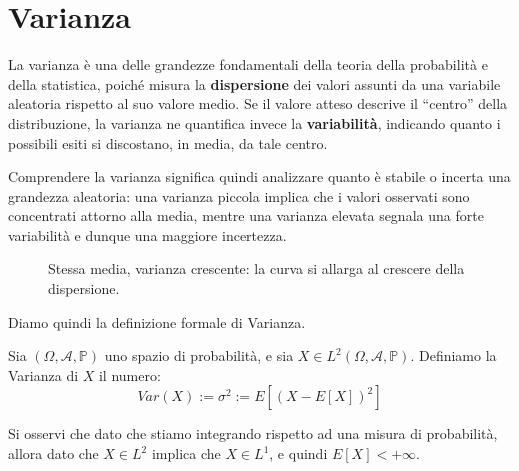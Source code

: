\section{Varianza}
La varianza è una delle grandezze fondamentali della teoria della probabilità e della statistica, poiché misura la \textbf{dispersione} dei valori assunti da una variabile aleatoria rispetto al suo valore medio. Se il valore atteso descrive il ``centro'' della distribuzione, la varianza ne quantifica invece la \textbf{variabilità}, 
indicando quanto i possibili esiti si discostano, in media, da tale centro.

\medskip

Comprendere la varianza significa quindi analizzare quanto è stabile o incerta una grandezza aleatoria: una varianza piccola implica che i valori osservati sono concentrati attorno alla media, mentre una varianza elevata segnala una forte variabilità e dunque una maggiore incertezza.

\begin{figure}[H]
\centering
{}
\caption{Stessa media, varianza crescente: la curva si allarga al crescere della dispersione.}
\end{figure}

Diamo quindi la definizione formale di Varianza.

\begin{definizione}[\faWarning]
    Sia $(\Omega, \mathcal{A}, \mathbb{P})$ uno spazio di probabilità, e sia $X\in L^2(\Omega, \mathcal{A}, \mathbb{P})$. Definiamo la Varianza di $X$ il numero:
    \[Var(X) := \sigma^2 :=E\left[(X-E[X])^2\right]\]
\end{definizione}
Si osservi che dato che stiamo integrando rispetto ad una misura di probabilità, allora dato che $X\in L^2$ implica che $X\in L^1$, e quindi $E[X]<+\infty$.


